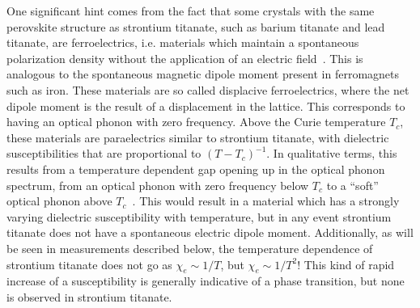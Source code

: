\documentclass{thesis-umich}
\begin{document}
One significant hint comes from the fact that some crystals with the same perovskite structure as strontium titanate, such as barium titanate and lead titanate, are ferroelectrics, i.e. materials which maintain a spontaneous polarization density without the application of an electric field~\cite{Jona1962}. This is analogous to the spontaneous magnetic dipole moment present in ferromagnets such as iron. These materials are so called displacive ferroelectrics, where the net dipole moment is the result of a displacement in the lattice. This corresponds to having an optical phonon with zero frequency. Above the Curie temperature $T_c$, these materials are paraelectrics similar to strontium titanate, with dielectric susceptibilities that are proportional to $(T - T_c)^{-1}$. In qualitative terms, this results from a temperature dependent gap opening up in the optical phonon spectrum, from an optical phonon with zero frequency below $T_c$ to a ``soft'' optical phonon above $T_c$~\cite{RowleyThesis}. This would result in a material which has a strongly varying dielectric susceptibility with temperature, but in any event strontium titanate does not have a spontaneous electric dipole moment. Additionally, as will be seen in measurements described below, the temperature dependence of strontium titanate does not go as $\chi_e \sim 1/T$, but $\chi_e \sim 1/T^2$! This kind of rapid increase of a susceptibility is generally indicative of a phase transition, but none is observed in strontium titanate. 
\end{document}
